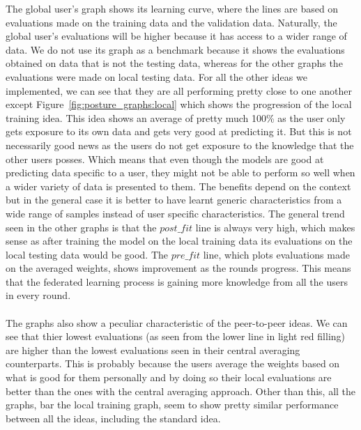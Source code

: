 \documentclass[12pt]{article}
\begin{document}
The global user's graph shows its learning curve, where the lines are based on evaluations made on the training data and the validation data. Naturally, the global user's evaluations will be higher because it has access to a wider range of data. We do not use its graph as a benchmark because it shows the evaluations obtained on data that is not the testing data, whereas for the other graphs the evaluations were made on local testing data. For all the other ideas we implemented, we can see that they are all performing pretty close to one another except Figure~\ref{fig:posture_graphs:local} which shows the progression of the local training idea. This idea shows an average of pretty much 100\% as the user only gets exposure to its own data and gets very good at predicting it. But this is not necessarily good news as the users do not get exposure to the knowledge that the other users posses. Which means that even though the models are good at predicting data specific to a user, they might not be able to perform so well when a wider variety of data is presented to them. The benefits depend on the context but in the general case it is better to have learnt generic characteristics from a wide range of samples instead of user specific characteristics. The general trend seen in the other graphs is that the $post\_fit$ line is always very high, which makes sense as after training the model on the local training data its evaluations on the local testing data would be good. The $pre\_fit$ line, which plots evaluations made on the averaged weights, shows improvement as the rounds progress. This means that the federated learning process is gaining more knowledge from all the users in every round. 
\\\\
The graphs also show a peculiar characteristic of the peer-to-peer ideas. We can see that thier lowest evaluations (as seen from the lower line in light red filling) are higher than the lowest evaluations seen in their central averaging counterparts. This is probably because the users average the weights based on what is good for them personally and by doing so their local evaluations are better than the ones with the central averaging approach. Other than this, all the graphs, bar the local training graph, seem to show pretty similar performance between all the ideas, including the standard idea.
\end{document}
